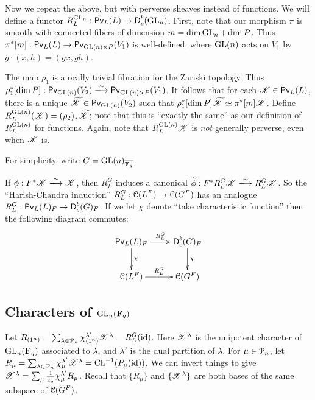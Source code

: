 \documentclass{article}
\begin{document}
Now we repeat the above, but with perverse sheaves instead of functions. 
We will define a functor 
$R_L^{\operatorname{GL}_n}:\operatorname{\mathsf{Pv}}_L(L) \to \operatorname{\mathsf{D}}_c^b(\operatorname{GL}_n)$. 
First, note that our morphism $\pi$ is smooth with connected fibers of dimension 
$m=\dim \operatorname{GL}_n + \dim P$. Thus 
$\pi^\ast[m]:\operatorname{\mathsf{Pv}}_L(L) \to \operatorname{\mathsf{Pv}}_{\operatorname{GL}(n)\times P}(V_1)$ is 
well-defined, where $\operatorname{GL}(n)$ acts on $V_1$ by 
$g\cdot (x,h) = (g x, g h)$. 

The map $\rho_1$ is a ocally trivial fibration for the Zariski topology. Thus 
$\rho_1^\ast[\dim P]:\perverse_{\generallinear(n)}(V_2) \isomorphism \perverse_{\generallinear(n)\times P}(V_1)$. It follows that for each 
$\mathscr{K}\in \operatorname{\mathsf{Pv}}_L(L)$, there is a unique 
$\widetilde{\mathscr{K}}\in \operatorname{\mathsf{Pv}}_{\operatorname{GL}(n)}(V_2)$ such that 
$\rho_1^\ast[\dim P]\widetilde{\mathscr{K}} \simeq \pi^\ast[m]\mathscr{K}$. Define 
$R_L^{\operatorname{GL}(n)}(\mathscr{K}) = (\rho_2)_\ast \widetilde{\mathscr{K}}$; note that this is 
``exactly the same'' as our definition of $R_L^{\operatorname{GL}(n)}$ for 
functions. Again, note that $R_L^{\operatorname{GL}(n)}\mathscr{K}$ is \emph{not} 
generally perverse, even when $\mathscr{K}$ is. 

For simplicity, write $G=\operatorname{GL}(n)_{\overline{\mathbf{F}_q}}$. 

If $\phi:F^\ast \sK\isomorphism \sK$, then $R_L^G$ induces a 
canonical $\widetilde\phi:F^\ast R_L^G\sK \isomorphism R_L^G \sK$. 
So the ``Harish-Chandra induction'' $R_L^G:\mathcal{C}(L^F) \to \mathcal{C}(G^F)$ has 
an analogue $R_L^G:\operatorname{\mathsf{Pv}}_L(L)_F \to \operatorname{\mathsf{D}}_c^b(G)_F$. If we 
let $\chi$ denote ``take characteristic function'' then the following 
diagram commutes:
\[\xymatrix{
  \perverse_L(L)_F \ar[r]^-{R_L^G} \ar[d]^-\chi 
    & \derived_c^b(G)_F \ar[d]^-\chi \\
  \cC(L^F) \ar[r]^-{R_L^G} 
    & \cC(G^F) 
}\]


\subsection{Characters of \texorpdfstring{$\operatorname{GL}_n(\mathbf{F}_q)$}{GLnFq}}

Let $R_{(1^n)}=\sum_{\lambda\in \mathcal{P}_n} \chi_{(1^n)}^{\lambda'} \mathscr{X}^\lambda = R_L^G(\textnormal{id})$. Here $\mathscr{X}^\lambda$ is the unipotent character of 
$\operatorname{GL}_n(\mathbf{F}_q)$ associated to $\lambda$, and $\lambda'$ is the 
dual partition of $\lambda$. For $\mu\in \mathcal{P}_n$, let 
$R_\mu = \sum_{\lambda\in \mathcal{P}_n} \chi_\mu^{\lambda'} \mathscr{X}^\lambda = \operatorname{Ch}^{-1}(P_\mu(\mathrm{id}))$. We can invert things to give 
$\mathscr{X}^\lambda = \sum_\mu \frac{1}{z_\mu} \chi_\mu^{\lambda'} R_\mu$. Recall that 
$\{R_\mu\}$ and $\{\mathscr{X}^\lambda\}$ are both bases of the same subspace of 
$\mathcal{C}(G^F)$. 
\end{document}
